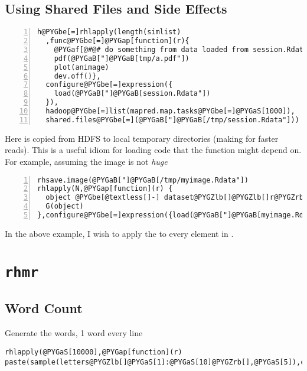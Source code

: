 \documentclass[letterpaper,10pt,english]{manual}
\begin{document}
\subsection{Using Shared Files and Side Effects}

\begin{Verbatim}[commandchars=@\[\],numbers=left,firstnumber=1,stepnumber=1]
h@PYGbe[=]rhlapply(length(simlist)
  ,func@PYGbe[=]@PYGap[function](r){
    @PYGaf[@#@# do something from data loaded from session.Rdata]
    pdf(@PYGaB["]@PYGaB[tmp/a.pdf"])
    plot(animage)
    dev.off()},
  configure@PYGbe[=]expression({
    load(@PYGaB["]@PYGaB[session.Rdata"])
  }),
  hadoop@PYGbe[=]list(mapred.map.tasks@PYGbe[=]@PYGaS[1000]),
  shared.files@PYGbe[=](@PYGaB["]@PYGaB[/tmp/session.Rdata"]))
\end{Verbatim}

Here  is copied from HDFS to local temporary directories (making for faster reads). This
is a useful idiom for loading code that the  function might depend on. For example, assuming the image is not \emph{huge}

\begin{Verbatim}[commandchars=@\[\],numbers=left,firstnumber=1,stepnumber=1]
rhsave.image(@PYGaB["]@PYGaB[/tmp/myimage.Rdata"])
rhlapply(N,@PYGap[function](r) {
  object @PYGbe[@textless[]-] dataset@PYGZlb[]@PYGZlb[]r@PYGZrb[]@PYGZrb[]
  G(object)
},configure@PYGbe[=]expression({load(@PYGaB["]@PYGaB[myimage.Rdata"])}))
\end{Verbatim}

In the above example, I wish to apply the  to every element in .


\section{\texttt{rhmr}}


\subsection{Word Count}

Generate the words, 1 word every line

\begin{Verbatim}[commandchars=@\[\]]
rhlapply(@PYGaS[10000],@PYGap[function](r) paste(sample(letters@PYGZlb[]@PYGaS[1]:@PYGaS[10]@PYGZrb[],@PYGaS[5]),collapse@PYGbe[=]@PYGaB["]@PYGaB["]),output.folder@PYGbe[=]'@PYGbe[/]tmp@PYGbe[/]words')
\end{Verbatim}
\end{document}
